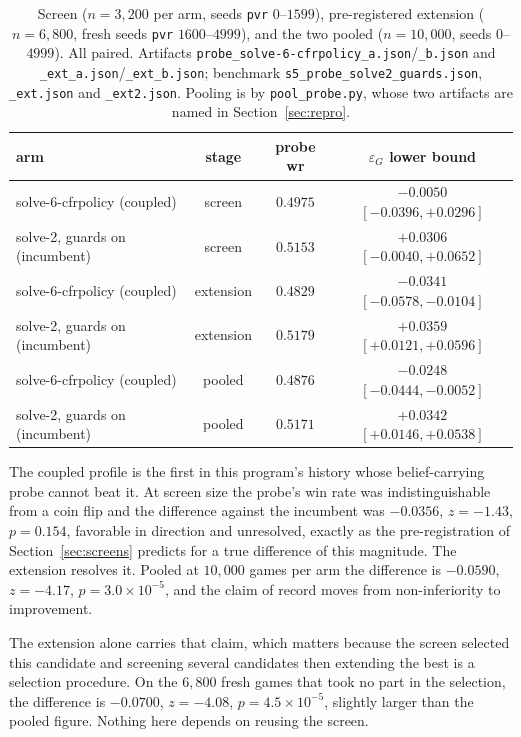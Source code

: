 \documentclass[11pt]{article}
\theoremstyle{plain}
\theoremstyle{definition}
\theoremstyle{remark}
\newcommand{\code}[1]{\texttt{\small #1}}
\newcommand{\game}{\ensuremath{G}}
\newcommand{\epsG}{\ensuremath{\varepsilon_{\game}}}
\begin{document}
\begin{table}[ht]
\centering\small
\begin{tabular}{@{}lccc@{}}
\toprule
arm & stage & probe wr & $\epsG$ lower bound \\
\midrule
solve-6-cfrpolicy (coupled) & screen & $0.4975$ &
  $-0.0050$ $[-0.0396, +0.0296]$ \\
solve-2, guards on (incumbent) & screen & $0.5153$ &
  $+0.0306$ $[-0.0040, +0.0652]$ \\
\addlinespace
solve-6-cfrpolicy (coupled) & extension & $0.4829$ &
  $-0.0341$ $[-0.0578, -0.0104]$ \\
solve-2, guards on (incumbent) & extension & $0.5179$ &
  $+0.0359$ $[+0.0121, +0.0596]$ \\
\addlinespace
solve-6-cfrpolicy (coupled) & pooled & $0.4876$ &
  $\mathbf{-0.0248}$ $[-0.0444, -0.0052]$ \\
solve-2, guards on (incumbent) & pooled & $0.5171$ &
  $+0.0342$ $[+0.0146, +0.0538]$ \\
\bottomrule
\end{tabular}
\caption{\sloppy Screen ($n=3{,}200$ per arm, seeds \code{pvr} $0$--$1599$),
pre-registered extension ($n=6{,}800$, fresh seeds \code{pvr}
$1600$--$4999$), and the two pooled ($n=10{,}000$, seeds
$0$--$4999$). All paired. Artifacts
\code{probe\_solve-6-cfrpolicy\_a.json}/\code{\_b.json} and
\code{\_ext\_a.json}/\code{\_ext\_b.json}; benchmark
\code{s5\_probe\_solve2\_guards.json}, \code{\_ext.json} and
\code{\_ext2.json}. Pooling is by \code{pool\_probe.py}, whose two
artifacts are named in Section~\ref{sec:repro}.}
\label{tab:verdict}
\end{table}

The coupled profile is the first in this program's history whose
belief-carrying probe cannot beat it. At screen size the probe's win
rate was indistinguishable from a coin flip and the difference against
the incumbent was $-0.0356$, $z=-1.43$, $p=0.154$, favorable in
direction and unresolved, exactly as the pre-registration of
Section~\ref{sec:screens} predicts for a true difference of this
magnitude. The extension resolves it. Pooled at $10{,}000$ games per
arm the difference is $-0.0590$, $z=-4.17$, $p=3.0\times10^{-5}$, and
the claim of record moves from non-inferiority to improvement.

The extension alone carries that claim, which matters because the
screen selected this candidate and screening several candidates then
extending the best is a selection procedure. On the $6{,}800$ fresh
games that took no part in the selection, the difference is $-0.0700$,
$z=-4.08$, $p=4.5\times10^{-5}$, slightly larger than the pooled
figure. Nothing here depends on reusing the screen.
\end{document}
